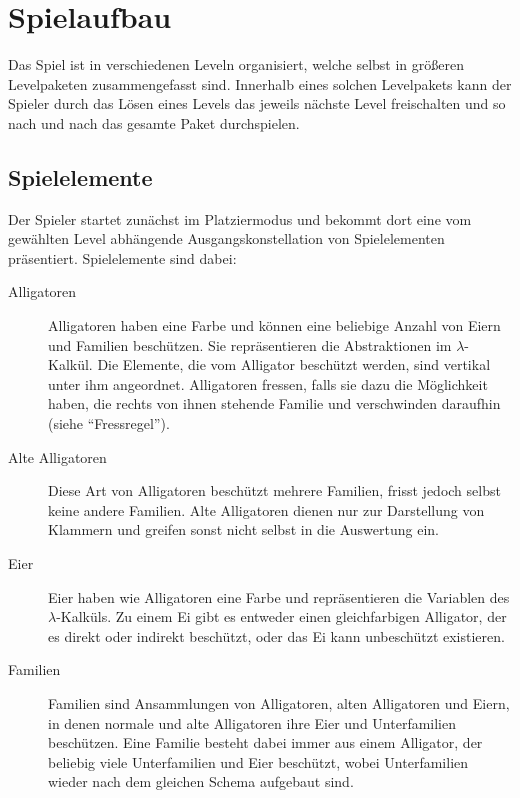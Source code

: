 \section{Spielaufbau}

Das Spiel ist in verschiedenen Leveln organisiert, welche selbst in größeren Levelpaketen zusammengefasst sind.
Innerhalb eines solchen Levelpakets kann der Spieler durch das Lösen eines Levels das jeweils nächste Level freischalten und so nach und nach das gesamte Paket durchspielen.

\subsection{Spielelemente}
Der Spieler startet zunächst im Platziermodus und bekommt dort eine vom gewählten Level abhängende Ausgangskonstellation von Spielelementen präsentiert. 
Spielelemente sind dabei:

        \begin{description}
                \item[Alligatoren] Alligatoren haben eine Farbe und können eine beliebige Anzahl von Eiern und Familien beschützen.
                Sie repräsentieren die Abstraktionen im \(\lambda\)-Kalkül.
                Die Elemente, die vom Alligator beschützt werden, sind vertikal unter ihm angeordnet.
                Alligatoren fressen, falls sie dazu die Möglichkeit haben, die rechts von ihnen stehende Familie und verschwinden daraufhin (siehe "`Fressregel"').

                \item[Alte Alligatoren] Diese Art von Alligatoren beschützt mehrere Familien, frisst jedoch selbst keine andere Familien.
                Alte Alligatoren dienen nur zur Darstellung von Klammern und greifen sonst nicht selbst in die Auswertung ein.

                \item[Eier] Eier haben wie Alligatoren eine Farbe und repräsentieren die Variablen des \(\lambda\)-Kalküls.
                Zu einem Ei gibt es entweder einen gleichfarbigen Alligator, der es direkt oder indirekt beschützt, oder das Ei kann unbeschützt existieren.

                \item[Familien] Familien sind Ansammlungen von Alligatoren, alten Alligatoren und Eiern, in denen normale und alte Alligatoren ihre Eier und Unterfamilien beschützen.
                Eine Familie besteht dabei immer aus einem Alligator, der beliebig viele Unterfamilien und Eier beschützt, wobei Unterfamilien wieder nach dem gleichen Schema aufgebaut sind.

        \end{description}


